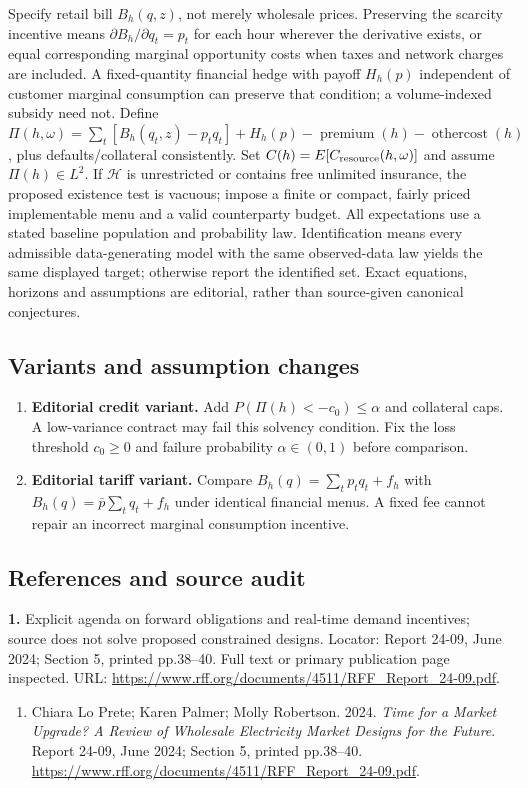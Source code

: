 \documentclass[11pt,a4paper]{article}
\begin{document}
Specify retail bill \(B_h(q,z)\), not merely wholesale prices. Preserving the scarcity incentive means \(\partial B_h/\partial q_t=p_t\) for each hour wherever the derivative exists, or equal corresponding marginal opportunity costs when taxes and network charges are included. A fixed-quantity financial hedge with payoff \(H_h(p)\) independent of customer marginal consumption can preserve that condition; a volume-indexed subsidy need not. Define \(\Pi(h,\omega)=\sum_t[B_h(q_t,z)-p_tq_t]+H_h(p)-\operatorname{premium}(h)-\operatorname{othercost}(h)\), plus defaults/collateral consistently. Set \(C(h)=E[C_{\rm resource}(h,\omega)]\) and assume \(\Pi(h)\in L^2\). If \(\mathcal H\) is unrestricted or contains free unlimited insurance, the proposed existence test is vacuous; impose a finite or compact, fairly priced implementable menu and a valid counterparty budget. All expectations use a stated baseline population and probability law. Identification means every admissible data-generating model with the same observed-data law yields the same displayed target; otherwise report the identified set. Exact equations, horizons and assumptions are editorial, rather than source-given canonical conjectures.
\subsection*{Variants and assumption changes}
\begin{enumerate}
\item \textbf{Editorial credit variant.} Add \(P(\Pi(h)<-c_0)\leq\alpha\) and collateral caps. A low-variance contract may fail this solvency condition. Fix the loss threshold \(c_0\geq0\) and failure probability \(\alpha\in(0,1)\) before comparison.
\item \textbf{Editorial tariff variant.} Compare \(B_h(q)=\sum_tp_tq_t+f_h\) with \(B_h(q)=\bar p\sum_tq_t+f_h\) under identical financial menus. A fixed fee cannot repair an incorrect marginal consumption incentive.
\end{enumerate}
\subsection*{References and source audit}
\textbf{1.} Explicit agenda on forward obligations and real-time demand incentives; source does not solve proposed constrained designs. Locator: Report 24-09, June 2024; Section 5, printed pp.38–40. Full text or primary publication page inspected. URL: \url{https://www.rff.org/documents/4511/RFF_Report_24-09.pdf}.
\begin{enumerate}\raggedright
\item\hypertarget{definitions:source:30007720:1}{} Chiara Lo Prete; Karen Palmer; Molly Robertson. 2024. \emph{Time for a Market Upgrade? A Review of Wholesale Electricity Market Designs for the Future}. Report 24-09, June 2024; Section 5, printed pp.38–40.
\url{https://www.rff.org/documents/4511/RFF_Report_24-09.pdf}.
\end{enumerate}
\end{document}
